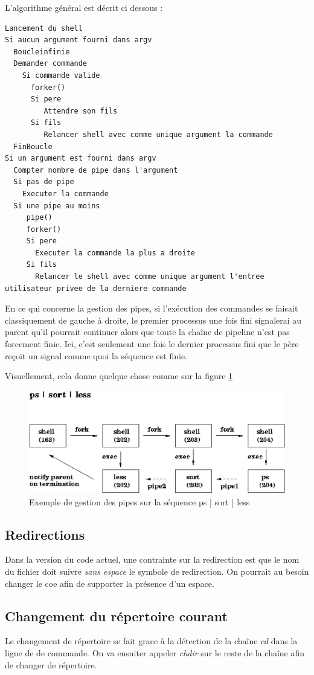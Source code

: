 \documentclass[fr]{article}
\begin{document}
L'algorithme général est décrit ci dessous : 
\begin{lstlisting}
Lancement du shell 
Si aucun argument fourni dans argv
  Boucleinfinie
  Demander commande
    Si commande valide
      forker() 
      Si pere 
         Attendre son fils
      Si fils 
         Relancer shell avec comme unique argument la commande
  FinBoucle
Si un argument est fourni dans argv
  Compter nombre de pipe dans l'argument
  Si pas de pipe
    Executer la commande
  Si une pipe au moins
     pipe()
     forker()
     Si pere
       Executer la commande la plus a droite
     Si fils
       Relancer le shell avec comme unique argument l'entree utilisateur privee de la derniere commande
\end{lstlisting}

En ce qui concerne la gestion des pipes, si l'exécution des commandes se faisait classiquement de gauche à
droite, le premier processus une fois fini signalerai au parent qu'il
pourrait continuer alors que toute la chaîne de pipeline n'est pas
forcement finie. Ici, c'est seulement une fois le dernier processus
fini que le père reçoit un signal comme quoi la séquence est finie.


Visuellement, cela donne quelque chose comme sur la figure \ref{pipe} 
\begin{figure}[!h]
\centering
  \includegraphics[scale=0.5]{img/pipes}
  \caption{Exemple de gestion des pipes sur la séquence ps | sort | less}
\label{pipe}
\end{figure}


\subsection{Redirections}
Dans la version du code actuel, une contrainte sur la redirection est que le nom du fichier doit
suivre \emph{sans espace} le symbole de redirection. On pourrait
au besoin changer le coe afin de supporter la présence d'un espace.

\subsection{Changement du répertoire courant}
Le changement de répertoire se fait grace à la détection de la
chaîne \emph{cd} dans la ligne de de commande. On va ensuiter appeler 
\emph{chdir} sur le reste de la chaîne afin de changer de répertoire.
\end{document}
